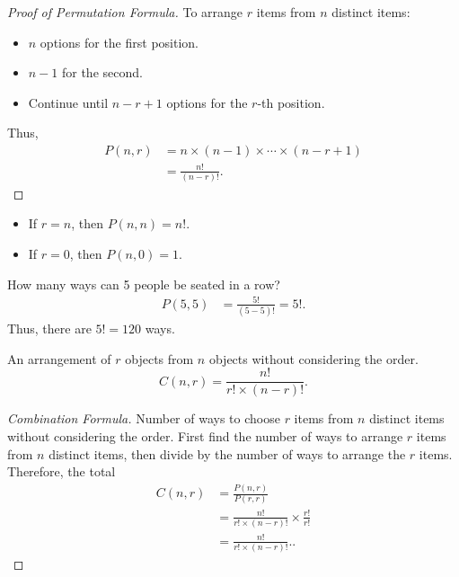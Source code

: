 \documentclass{article}
\begin{document}
\begin{proof}[Proof of Permutation Formula]
To arrange $r$ items from $n$ distinct items:
\begin{itemize}
    \item $n$ options for the first position.
    \item $n-1$ for the second.
    \item Continue until $n-r+1$ options for the $r$-th position.
\end{itemize}
Thus,
\begin{align*}
    P(n, r) &= n \times (n-1) \times \cdots \times (n-r+1) \\
    &= \frac{n!}{(n-r)!}.
\end{align*}
\end{proof}

\begin{remark}
\begin{itemize}
    \item If $r=n$, then $P(n, n) = n!$.
    \item If $r=0$, then $P(n, 0) = 1$.
\end{itemize}
\end{remark}

\begin{example}
How many ways can 5 people be seated in a row?
\begin{align*}
    P(5, 5) &= \frac{5!}{(5-5)!} = 5!.
\end{align*}
Thus, there are $5! = 120$ ways.
\end{example}

\begin{definition}[Combination]
    An arrangement of $r$ objects from $n$ objects without considering the order.
    \[
        C(n,r)=\frac{n!}{r!\times (n-r)!}
    .\] 
\end{definition}

\begin{proof}[Combination Formula]
    Number of ways to choose $r$ items from $n$ distinct items without considering the order. First find the number of ways to arrange $r$ items from $n$ distinct items, then divide by the number of ways to arrange the $r$ items. Therefore, the total
    \begin{align*}
        C(n,r) &= \frac{P(n,r)}{P(r,r)} \\
               &= \frac{n!}{r!\times(n-r)!} \times \frac{r!}{r!} \\
               &= \frac{n!}{r!\times(n-r)!}.
    .\end{align*}
\end{proof}
\end{document}
